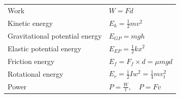 \documentclass{article}
\begin{document}
\begin{tabular}{|l|l|}
    Work                              & $W=Fd$                                                                                  \\
    Kinetic energy                    & $E_k=\frac{1}{2}mv^2$                                                                   \\
    Gravitational potential energy    & $E_{GP}=mgh$                                                                            \\
    Elastic potential energy          & $E_{EP}=\frac{1}{2}kx^2$                                                                \\
    Friction energy                   & $E_{f}=F_f\times d=\mu mgd$                                                             \\
    Rotational energy                 & $E_{r}=\frac{1}{2}Iw^2=\frac14mv_t^2$                                                   \\
    Power                             & $P=\frac{W}{t},\quad P=Fv$                                                              \\\hline
\end{tabular}
\end{document}
